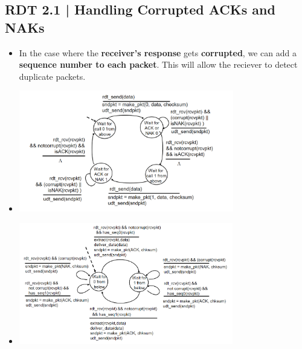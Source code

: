 \documentclass{article}
\begin{document}
    \subsection*{RDT 2.1 | Handling Corrupted ACKs and NAKs}
    \begin{itemize}
        \item In the case where the \textbf{receiver's response} gets \textbf{corrupted}, we can add a \textbf{sequence number to each packet}. This will allow the reciever to detect duplicate packets.
        \item[] \begin{center}
                    \includegraphics*[height=200px]{images/RDT-2.1.PNG}
                \end{center}
        \item[] \begin{center}
                   \includegraphics*[height=200px]{images/RDT-2.1-1.PNG}
                \end{center}
    \end{itemize}
\end{document}

